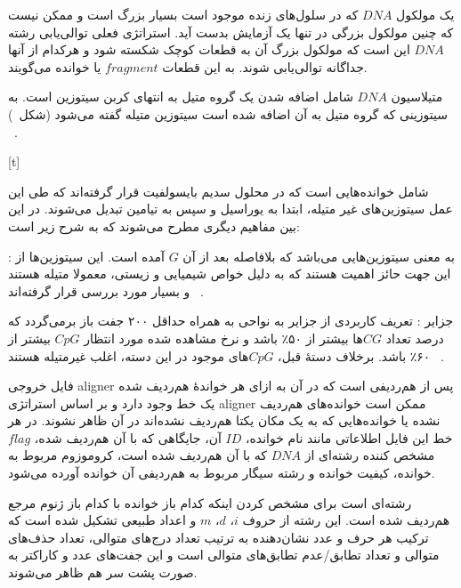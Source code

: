 
یک مولکول $DNA$ که در سلول‌های زنده موجود است بسیار بزرگ است و ممکن نیست که چنین مولکول بزرگی در تنها یک آزمایش بدست آید. استراتژی فعلی توالی‌یابی رشته $DNA$ این است که مولکول بزرگ آن به قطعات کوچک شکسته شود و هرکدام از آنها جداگانه توالی‌یابی شوند. به این قطعات $fragment$ یا خوانده می‌گویند.


متیلاسیون $DNA$ شامل اضافه شدن یک گروه متیل به انتهای کربن سیتوزین است. به سیتوزینی که گروه متیل به آن اضافه شده است سیتوزین متیله گفته می‌شود (شکل~)
~\cite{krueger2012dna}.

[t]



شامل خوانده‌هایی است که در محلول سدیم بایسولفیت قرار گرفته‌اند که طی این عمل سیتوزین‌های غیر متیله، ابتدا به یوراسیل و سپس به تیامین تبدیل می‌شوند. در این بین مفاهیم دیگری مطرح می‌شوند که به شرح زیر است:


 :
 به معنی سیتوزین‌هایی می‌باشد که بلافاصله بعد از آن  $G$ آمده است. این سیتوزین‌ها از این جهت حائز اهمیت هستند که به دلیل خواص شیمیایی و زیستی، معمولا متیله هستند و بسیار مورد بررسی قرار گرفته‌اند
~\cite{meissner2008genome}.

 جزایر :
تعریف کاربردی از جزایر  به نواحی به همراه حداقل ۲۰۰ جفت باز برمی‌گردد که درصد تعداد $CG$ها بیشتر از ۵۰٪ باشد و نرخ مشاهده شده مورد انتظار $CpG$ بیشتر از ۶۰٪ باشد. برخلاف دستهٔ قبل، $CpG$های موجود در این دسته، اغلب غیرمتیله هستند
~\cite{meissner2008genome}.



فایل خروجی aligner پس از هم‌ردیفی است که در آن به ازای هر خواندهٔ هم‌ردیف شده یک خط وجود دارد و بر اساس استراتژی aligner ممکن است خوانده‌های هم‌ردیف نشده یا خوانده‌هایی که به یک مکان یکتا هم‌ردیف نشده‌اند در آن ظاهر نشوند. در هر خط این فایل اطلاعاتی مانند نام خوانده، $ID$ آن، جایگاهی که با آن هم‌ردیف شده، $flag$ مشخص کننده رشته‌ای از $DNA$ که با آن هم‌ردیف شده است، کروموزوم مربوط به خوانده، کیفیت خوانده و رشته سیگار  مربوط به هم‌ردیفی آن خوانده آورده می‌شود.


رشته‌ای است برای مشخص کردن اینکه کدام باز خوانده با کدام باز ژنوم مرجع هم‌ردیف شده است. این رشته از حروف $i$، $d$، $m$ و اعداد طبیعی تشکیل شده است که ترکیب هر حرف و عدد نشان‌دهنده به ترتیب تعداد درج‌های متوالی، تعداد حذف‌های متوالی و تعداد تطابق/عدم تطابق‌های متوالی است و این جفت‌های عدد و کاراکتر به صورت پشت سر هم ظاهر می‌شوند.


